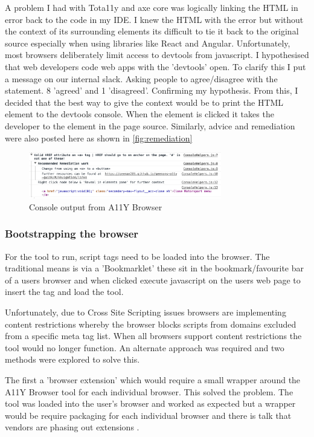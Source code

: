 A problem I had with Tota11y and axe core was logically linking the HTML in
error back to the code in my IDE. I knew the HTML with the error but
without the context of its surrounding elements its difficult to tie it back
to the original source especially when using libraries like React and Angular.
Unfortunately, most browsers deliberately limit access to devtools from
javascript. I hypothesised that web developers code web apps with the
'devtools' open. To clarify this I put a message on our internal slack.
Asking people to agree/disagree with the statement. 8 'agreed' and 1 'disagreed'. Confirming my hypothesis.
From this, I decided that the best way to give the context would be to print
the HTML element to the devtools console. When the element is clicked it takes
the developer to the element in the page source. Similarly, advice and
remediation were also posted here as shown in \ref{fig:remediation}

\begin{figure}[H]
\centering
\includegraphics[width=0.75\textwidth]{figures/a11y_tool_remediation}
\captionsetup{justification=centering}
\caption{Console output from A11Y Browser
\label{fig:a11y_tool_remediation}}
\end{figure}

\subsubsection{Bootstrapping the browser}
For the tool to run, script tags need to be loaded into the browser. The traditional means is via a
'Bookmarklet' these sit in the bookmark/favourite bar of a users
browser and when clicked execute javascript on the users web page to insert the
 tag and load the tool.

Unfortunately, due to Cross Site Scripting issues browsers are implementing
content restrictions \citep{bookmarklets} whereby the browser blocks scripts from domains
excluded from a specific meta tag list. When all browsers support
content restrictions the tool would no longer function. An alternate approach
was required and two methods were explored to solve this.

The first a 'browser extension' which would require a small wrapper around
the A11Y Browser tool for each individual browser. This solved the problem.
The tool was loaded into the user's browser and worked as expected but a
wrapper would be require packaging for each individual browser and there is
talk that vendors are phasing out extensions \citep{chromeapps}.

